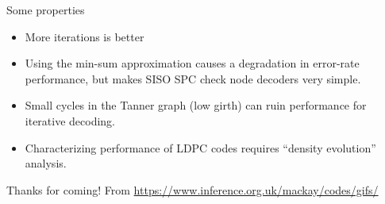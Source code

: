\documentclass[aspectratio=1610, 10pt]{beamer}
\begin{document}
\begin{frame}[label={sec:org92b3904}]{Some properties}
\begin{itemize}
\item More iterations is better
\item Using the min-sum approximation causes a degradation in error-rate
performance, but makes SISO SPC check node decoders very simple.
\item Small cycles in the Tanner graph (low girth) can ruin performance
for iterative decoding.
\item Characterizing performance of LDPC codes requires ``density
evolution'' analysis.
\end{itemize}
\end{frame}

\begin{frame}[label={sec:org85735ae}]{Thanks for coming!}
\tiny From \url{https://www.inference.org.uk/mackay/codes/gifs/}
\begin{center}
\end{center}
\end{frame}
\end{document}
